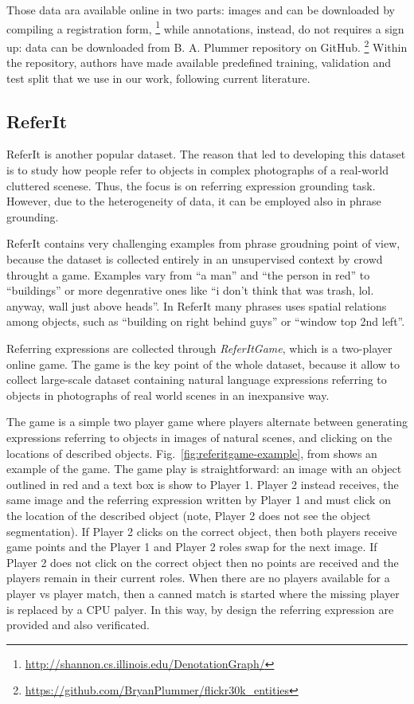 Those data ara available online in two parts: images and can be
downloaded by compiling a registration form,
\footnote{\href{http://shannon.cs.illinois.edu/DenotationGraph/}{http://shannon.cs.illinois.edu/DenotationGraph/}}
while annotations, instead, do not requires a sign up: data can be
downloaded from B. A. Plummer repository on GitHub.
\footnote{\href{https://github.com/BryanPlummer/flickr30k\_entities}{https://github.com/BryanPlummer/flickr30k\_entities}}
Within the repository, authors have made available predefined
training, validation and test split that we use in our work, following
current literature.

\subsection{ReferIt}

ReferIt  is another popular dataset. The reason
that led to developing this dataset is to study how people refer to
objects in complex photographs of a real-world cluttered scenese.
Thus, the focus is on referring expression grounding task. However,
due to the heterogeneity of data, it can be employed also in phrase
grounding.

ReferIt contains very challenging examples from phrase groudning point
of view, because the dataset is collected entirely in an unsupervised
context by crowd throught a game. Examples vary from ``a man'' and
``the person in red'' to ``buildings'' or more degenrative ones like
``i don't think that was trash, lol. anyway, wall just above heads''.
In ReferIt many phrases uses spatial relations among objects, such as
``building on right behind guys'' or ``window top 2nd left''.

Referring expressions are collected through \textit{ReferItGame},
which is a two-player online game. The game is the key point of the
whole dataset, because it allow to collect large-scale dataset
containing natural language expressions referring to objects in
photographs of real world scenes in an inexpansive way.

The game is a simple two player game where players alternate between
generating expressions referring to objects in images of natural
scenes, and clicking on the locations of described objects.
Fig.~\ref{fig:referitgame-example}, from 
shows an example of the game. The game play is straightforward: an
image with an object outlined in red and a text box is show to Player
1. Player 2 instead receives, the same image and the referring
expression written by Player 1 and must click on the location of the
described object (note, Player 2 does not see the object
segmentation). If Player 2 clicks on the correct object, then both
players receive game points and the Player 1 and Player 2 roles swap
for the next image. If Player 2 does not click on the correct object
then no points are received and the players remain in their current
roles. When there are no players available for a player vs player
match, then a canned match is started where the missing player is
replaced by a CPU palyer. In this way, by design the referring
expression are provided and also verificated. 

